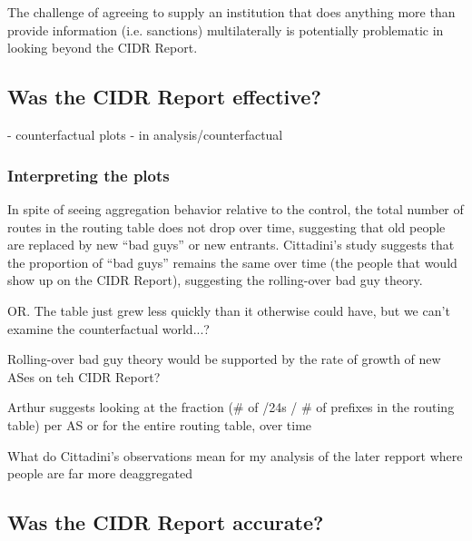 \chapter{}
\label{chap:discussion}


The challenge of agreeing to supply an institution that does anything more than provide information (i.e. sanctions) multilaterally is potentially problematic in looking beyond the CIDR Report.


\section{Was the CIDR Report effective?}
- counterfactual plots
- in analysis/counterfactual

\subsection{Interpreting the plots}

In spite of seeing aggregation behavior relative to the control, the total number of routes in the routing table does not drop over time, suggesting that old people are replaced by new ``bad guys'' or new entrants. Cittadini's study suggests that the proportion of ``bad guys'' remains the same over time (the people that would show up on the CIDR Report), suggesting the rolling-over bad guy theory.

OR. The table just grew less quickly than it otherwise could have, but we can't examine the counterfactual world...?

Rolling-over bad guy theory would be supported by the rate of growth of new ASes on teh CIDR Report?

Arthur suggests looking at the fraction (\# of /24s / \# of prefixes in the routing table) per AS or for the entire routing table, over time

What do Cittadini's observations mean for my analysis of the later repport where people are far more deaggregated

\section{Was the CIDR Report accurate?}
